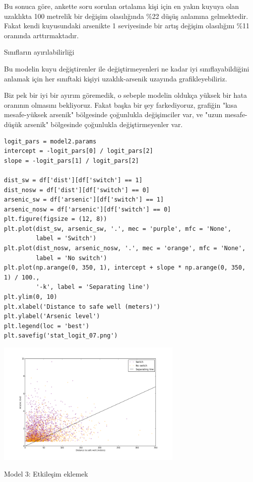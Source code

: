 \documentclass[12pt,fleqn]{article}\usepackage{../../common}
\begin{document}
Bu sonuca göre, ankette soru sorulan ortalama kişi için en yakın kuyuya olan
uzaklıkta 100 metrelik bir değişim olasılığında \%22 düşüş anlamına
gelmektedir. Fakat kendi kuyusundaki arsenikte 1 seviyesinde bir artış değişim
olasılığını \%11 oranında arttırmaktadır.

Sınıfların ayırılabilirliği

Bu modelin kuyu değiştirenler ile değiştirmeyenleri ne kadar iyi
sınıflayabildiğini anlamak için her sınıftaki kişiyi uzaklık-arsenik uzayında
grafikleyebiliriz.

Biz pek bir iyi bir ayırım göremedik, o sebeple modelin oldukça yüksek bir hata
oranının olmasını bekliyoruz. Fakat başka bir şey farkediyoruz, grafiğin "kısa
mesafe-yüksek arsenik" bölgesinde çoğunlukla değişimciler var, ve "uzun
mesafe-düşük arsenik" bölgesinde çoğunlukla değiştirmeyenler var.

\begin{verbatim}
logit_pars = model2.params
intercept = -logit_pars[0] / logit_pars[2]
slope = -logit_pars[1] / logit_pars[2]

dist_sw = df['dist'][df['switch'] == 1]
dist_nosw = df['dist'][df['switch'] == 0]
arsenic_sw = df['arsenic'][df['switch'] == 1]
arsenic_nosw = df['arsenic'][df['switch'] == 0]
plt.figure(figsize = (12, 8))
plt.plot(dist_sw, arsenic_sw, '.', mec = 'purple', mfc = 'None', 
         label = 'Switch')
plt.plot(dist_nosw, arsenic_nosw, '.', mec = 'orange', mfc = 'None', 
         label = 'No switch')
plt.plot(np.arange(0, 350, 1), intercept + slope * np.arange(0, 350, 1) / 100.,
         '-k', label = 'Separating line')
plt.ylim(0, 10)
plt.xlabel('Distance to safe well (meters)')
plt.ylabel('Arsenic level')
plt.legend(loc = 'best')
plt.savefig('stat_logit_07.png')
\end{verbatim}

\includegraphics[height=6cm]{stat_logit_07.png}

Model 3: Etkileşim eklemek
\end{document}
